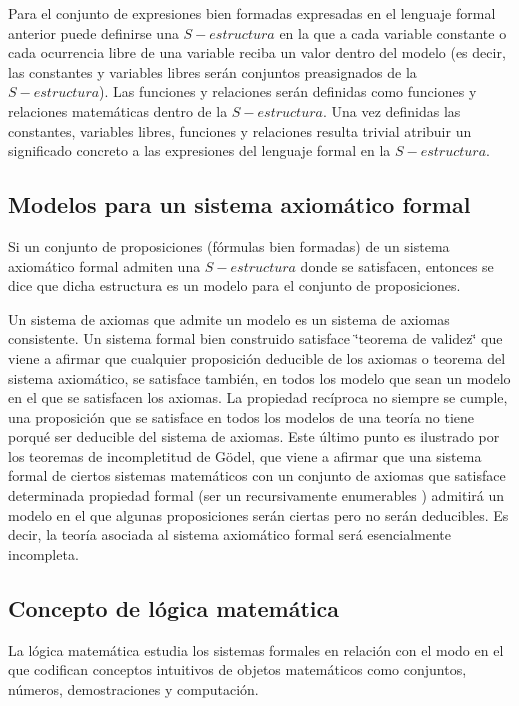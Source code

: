 Para el conjunto de expresiones bien formadas expresadas en el lenguaje
formal anterior puede definirse una $S-estructura$ en la que a cada
variable constante o cada ocurrencia libre de una variable reciba
un valor dentro del modelo (es decir, las constantes y variables libres
serán conjuntos preasignados de la $S-estructura$). Las funciones
y relaciones serán definidas como funciones y relaciones matemáticas
dentro de la $S-estructura$. Una vez definidas las constantes, variables
libres, funciones y relaciones resulta trivial atribuir un significado
concreto a las expresiones del lenguaje formal en la $S-estructura$.

\subsection{Modelos para un sistema axiomático formal}

Si un conjunto de proposiciones (fórmulas bien formadas) de un sistema
axiomático formal admiten una $S-estructura$ donde se satisfacen,
entonces se dice que dicha estructura es un modelo para el conjunto
de proposiciones.

Un sistema de axiomas que admite un modelo es un sistema de axiomas
consistente. Un sistema formal bien construido satisface \char`\"{}teorema
de validez\char`\"{} que viene a afirmar que cualquier proposición
deducible de los axiomas o teorema del sistema axiomático, se satisface
también, en todos los modelo que sean un modelo en el que se satisfacen
los axiomas. La propiedad recíproca no siempre se cumple, una proposición
que se satisface en todos los modelos de una teoría no tiene porqué
ser deducible del sistema de axiomas. Este último punto es ilustrado
por los teoremas de incompletitud de Gödel, que viene a afirmar que
una sistema formal de ciertos sistemas matemáticos con un conjunto
de axiomas que satisface determinada propiedad formal (ser un recursivamente
enumerables ) admitirá un modelo en el que algunas proposiciones serán
ciertas pero no serán deducibles. Es decir, la teoría asociada al
sistema axiomático formal será esencialmente incompleta. 

\subsection{Concepto de lógica matemática}

La lógica matemática estudia los sistemas formales en relación con
el modo en el que codifican conceptos intuitivos de objetos matemáticos
como conjuntos, números, demostraciones y computación. 


